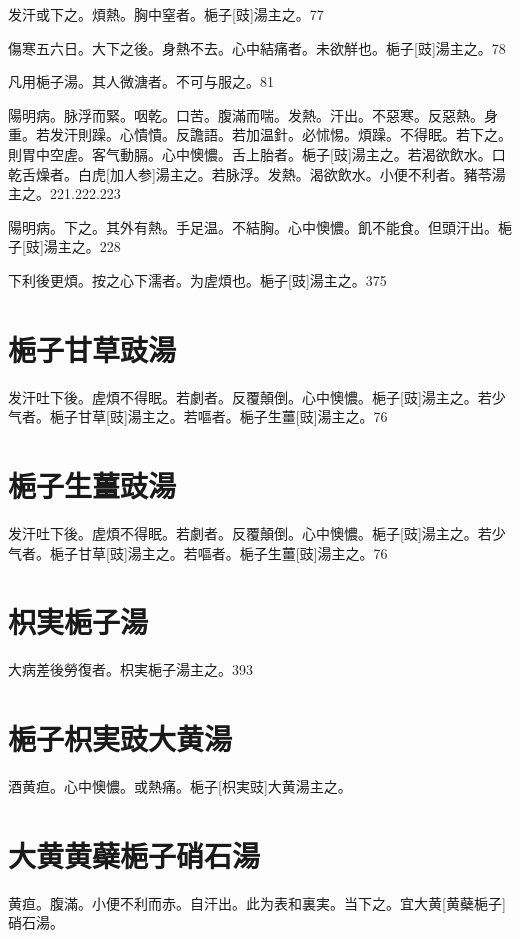 \documentclass[12pt,twoside,UTF8,b5paper]{ctexbook}
\begin{document}
发汗或下之。煩熱。胸中窒者。梔子[豉]湯主之。77

傷寒五六日。大下之後。身熱不去。心中結痛者。未欲觧也。梔子[豉]湯主之。78

凡用梔子湯。其人微溏者。不可与服之。81

陽明病。脉浮而緊。咽乾。口苦。腹滿而喘。发熱。汗出。不惡寒。反惡熱。身重。若发汗則躁。心憒憒。反譫語。若加温針。必怵惕。煩躁。不得眠。若下之。則胃中空虗。客气動膈。心中懊憹。舌上胎者。梔子[豉]湯主之。若渴欲飲水。口乾舌燥者。白虎[加人参]湯主之。若脉浮。发熱。渴欲飲水。小便不利者。豬苓湯主之。221.222.223

陽明病。下之。其外有熱。手足温。不結胸。心中懊憹。飢不能食。但頭汗出。梔子[豉]湯主之。228

下利後更煩。按之心下濡者。为虗煩也。梔子[豉]湯主之。375

\section{梔子甘草豉湯}

发汗吐下後。虗煩不得眠。若劇者。反覆顛倒。心中懊憹。梔子[豉]湯主之。若少气者。梔子甘草[豉]湯主之。若嘔者。梔子生薑[豉]湯主之。76

\section{梔子生薑豉湯}

发汗吐下後。虗煩不得眠。若劇者。反覆顛倒。心中懊憹。梔子[豉]湯主之。若少气者。梔子甘草[豉]湯主之。若嘔者。梔子生薑[豉]湯主之。76

\section{枳実梔子湯}

大病差後勞復者。枳実梔子湯主之。393

\section{梔子枳実豉大黄湯}

酒黄疸。心中懊憹。或熱痛。梔子[枳実豉]大黄湯主之。

\section{大黄黄蘗梔子硝石湯}

黄疸。腹滿。小便不利而赤。自汗出。此为表和裏実。当下之。宜大黄[黄蘗梔子]硝石湯。
\end{document}
